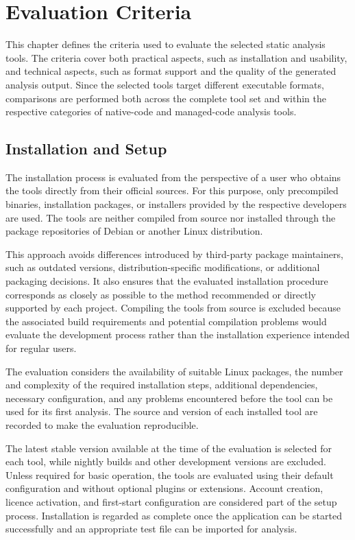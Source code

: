 \cleardoubleoddpage%
\chapter{Evaluation Criteria}
\label{sec:evaluation}
This chapter defines the criteria used to evaluate the selected static analysis tools. The criteria cover both practical aspects, such as installation and usability, 
and technical aspects, such as format support and the quality of the generated analysis output. Since the selected tools target different executable formats, 
comparisons are performed both across the complete tool set and within the respective categories of native-code and managed-code analysis tools.

\section{Installation and Setup}
\label{sec:evaluation:installation}
The installation process is evaluated from the perspective of a user who obtains the tools directly from their official sources. For this purpose, only precompiled binaries, 
installation packages, or installers provided by the respective developers are used. The tools are neither compiled from source nor installed through the package repositories 
of Debian or another Linux distribution.

This approach avoids differences introduced by third-party package maintainers, such as outdated versions, distribution-specific modifications, or additional packaging decisions. 
It also ensures that the evaluated installation procedure corresponds as closely as possible to the method recommended or directly supported by each project. 
Compiling the tools from source is excluded because the associated build requirements and potential compilation problems would evaluate the development process rather than the 
installation experience intended for regular users.

The evaluation considers the availability of suitable Linux packages, the number and complexity of the required installation steps, additional dependencies, necessary configuration, 
and any problems encountered before the tool can be used for its first analysis. The source and version of each installed tool are recorded to make the evaluation reproducible.

The latest stable version available at the time of the evaluation is selected for each tool, while nightly builds and other development versions are excluded. 
Unless required for basic operation, the tools are evaluated using their default configuration and without optional plugins or extensions. Account creation, 
licence activation, and first-start configuration are considered part of the setup process. Installation is regarded as complete once the application can be started successfully 
and an appropriate test file can be imported for analysis.

